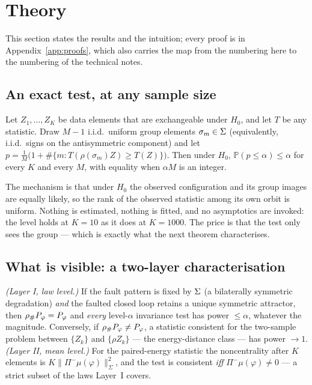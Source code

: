 \section{Theory}
\label{sec:theory}

This section states the results and the intuition; every proof is in Appendix~\ref{app:proofs}, which also carries the
map from the numbering here to the numbering of the technical notes.

\subsection{An exact test, at any sample size}

\begin{theorem}
\label{thm:exact}
Let $Z_1,\dots,Z_K$ be data elements that are exchangeable under $H_0$, and let $T$ be any statistic. Draw $M-1$ i.i.d.\
uniform group elements $\sigma_m\in\Sigma$ (equivalently, i.i.d.\ signs on the antisymmetric component) and let
$p=\frac{1}{M}\bigl(1+\#\{m: T(\rho(\sigma_m)Z)\ge T(Z)\}\bigr)$. Then under $H_0$, $\mathbb{P}(p\le\alpha)\le\alpha$
for every $K$ and every $M$, with equality when $\alpha M$ is an integer.
\end{theorem}
The mechanism is that under $H_0$ the observed configuration and its group images are equally likely, so the rank of the
observed statistic among its own orbit is uniform. Nothing is estimated, nothing is fitted, and no asymptotics are
invoked: the level holds at $K=10$ as it does at $K=1000$. The price is that the test only sees the group --- which is
exactly what the next theorem characterises.

\subsection{What is visible: a two-layer characterisation}

\begin{theorem}
\label{thm:twolayer}
\emph{(Layer I, law level.)} If the fault pattern is fixed by $\Sigma$ (a bilaterally symmetric degradation) \emph{and}
the faulted closed loop retains a unique symmetric attractor, then ${\rho}_{\#}P_\varphi=P_\varphi$ and \emph{every}
level-$\alpha$ invariance test has power $\le\alpha$, whatever the magnitude. Conversely, if
${\rho}_{\#}P_\varphi\ne P_\varphi$, a statistic consistent for the two-sample problem between $\{Z_k\}$ and
$\{\rho Z_k\}$ --- the energy-distance class --- has power $\to 1$.
\emph{(Layer II, mean level.)} For the paired-energy statistic the noncentrality after $K$ elements is
$K\|\Pi^-\mu(\varphi)\|^2_\Sigma$, and the test is consistent \emph{iff} $\Pi^-\mu(\varphi)\ne 0$ --- a strict subset of
the laws Layer~I covers.
\end{theorem}

